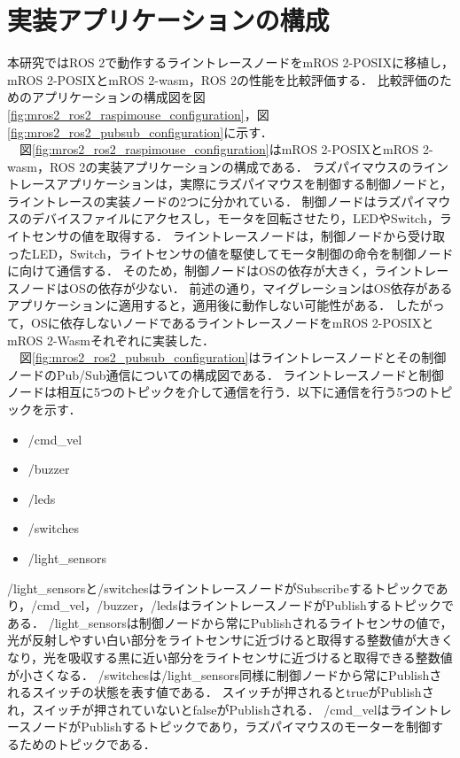 \section{実装アプリケーションの構成}
本研究ではROS 2で動作するライントレースノードをmROS 2-POSIXに移植し，mROS 2-POSIXとmROS 2-wasm，ROS 2の性能を比較評価する．
比較評価のためのアプリケーションの構成図を図\ref{fig:mros2_ros2_raspimouse_configuration}，図\ref{fig:mros2_ros2_pubsub_configuration}に示す．
\\　図\ref{fig:mros2_ros2_raspimouse_configuration}はmROS 2-POSIXとmROS 2-wasm，ROS 2の実装アプリケーションの構成である．
ラズパイマウスのライントレースアプリケーションは，実際にラズパイマウスを制御する制御ノードと，ライントレースの実装ノードの2つに分かれている．
制御ノードはラズパイマウスのデバイスファイルにアクセスし，モータを回転させたり，LEDやSwitch，ライトセンサの値を取得する．
ライントレースノードは，制御ノードから受け取ったLED，Switch，ライトセンサの値を駆使してモータ制御の命令を制御ノードに向けて通信する．
そのため，制御ノードはOSの依存が大きく，ライントレースノードはOSの依存が少ない．
前述の通り，マイグレーションはOS依存があるアプリケーションに適用すると，適用後に動作しない可能性がある．
したがって，OSに依存しないノードであるライントレースノードをmROS 2-POSIXとmROS 2-Wasmそれぞれに実装した．
\\　図\ref{fig:mros2_ros2_pubsub_configuration}はライントレースノードとその制御ノードのPub/Sub通信についての構成図である．
ライントレースノードと制御ノードは相互に5つのトピックを介して通信を行う．以下に通信を行う5つのトピックを示す．
\begin{itemize}
    \item /cmd\_vel
    \item /buzzer
    \item /leds
    \item /switches
    \item /light\_sensors    
\end{itemize}
/light\_sensorsと/switchesはライントレースノードがSubscribeするトピックであり，/cmd\_vel，/buzzer，/ledsはライントレースノードがPublishするトピックである．
/light\_sensorsは制御ノードから常にPublishされるライトセンサの値で，光が反射しやすい白い部分をライトセンサに近づけると取得する整数値が大きくなり，光を吸収する黒に近い部分をライトセンサに近づけると取得できる整数値が小さくなる．
/switchesは/light\_sensors同様に制御ノードから常にPublishされるスイッチの状態を表す値である．
スイッチが押されるとtrueがPublishされ，スイッチが押されていないとfalseがPublishされる．
/cmd\_velはライントレースノードがPublishするトピックであり，ラズパイマウスのモーターを制御するためのトピックである．
